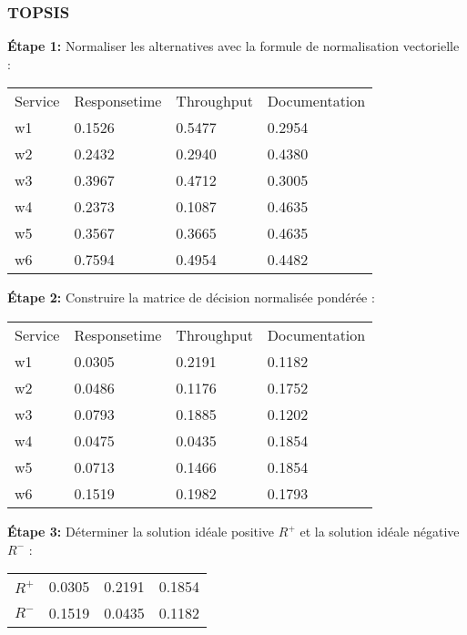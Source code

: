 \documentclass[french, 11pt, a4paper, oldfontcommands]{report}
\begin{document}
	\subsubsection{TOPSIS}
		\textbf{Étape 1:} Normaliser les alternatives avec la formule de normalisation vectorielle :
		\begin{table}[ht]
			\begin{tabular}{llll}
			\rowcolor[HTML]{9B9B9B} 
			Service & Responsetime & Throughput & Documentation \\
			w1      & 0.1526       & 0.5477     & 0.2954        \\
			\rowcolor[HTML]{EFEFEF} 
			w2      & 0.2432       & 0.2940     & 0.4380        \\
			w3      & 0.3967       & 0.4712     & 0.3005        \\
			\rowcolor[HTML]{EFEFEF} 
			w4      & 0.2373       & 0.1087     & 0.4635        \\
			w5      & 0.3567       & 0.3665     & 0.4635        \\
			\rowcolor[HTML]{EFEFEF} 
			w6      & 0.7594       & 0.4954     & 0.4482       
			\end{tabular}
		\end{table}
		\par
		\textbf{Étape 2:} Construire la matrice de décision normalisée pondérée :
		\begin{table}[ht]
			\begin{tabular}{llll}
			\rowcolor[HTML]{9B9B9B} 
			Service & Responsetime & Throughput & Documentation \\
			w1      & 0.0305       & 0.2191     & 0.1182        \\
			\rowcolor[HTML]{EFEFEF} 
			w2      & 0.0486       & 0.1176     & 0.1752        \\
			w3      & 0.0793       & 0.1885     & 0.1202        \\
			\rowcolor[HTML]{EFEFEF} 
			w4      & 0.0475       & 0.0435     & 0.1854        \\
			w5      & 0.0713       & 0.1466     & 0.1854        \\
			\rowcolor[HTML]{EFEFEF} 
			w6      & 0.1519       & 0.1982     & 0.1793       
			\end{tabular}
		\end{table}
        \par
        \newpage
		\textbf{Étape 3:} Déterminer la solution idéale positive $R^+$ et la solution idéale négative $R^-$ :
		\begin{table}[ht]
			\begin{tabular}{llll}
			\rowcolor[HTML]{C0C0C0} 
			$R^+$ & 0.0305 & 0.2191 & 0.1854 \\
			\rowcolor[HTML]{EFEFEF} 
			$R^-$ & 0.1519 & 0.0435 & 0.1182
			\end{tabular}
		\end{table}
\end{document}
